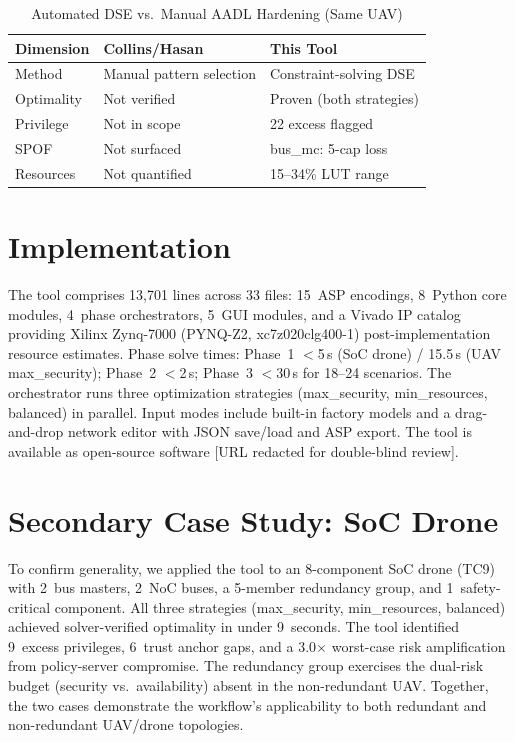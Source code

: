\documentclass[conference]{IEEEtran}
\begin{document}
\begin{table}[t]
\caption{Automated DSE vs.\ Manual AADL Hardening (Same UAV)}
\label{tab:comparison}
\centering
\scriptsize
\setlength{\tabcolsep}{3pt}
\begin{tabular}{lll}
\toprule
Dimension & Collins/Hasan~\cite{hasan_saecps} & This Tool \\
\midrule
Method    & Manual pattern selection & Constraint-solving DSE \\
Optimality& Not verified & Proven (both strategies) \\
Privilege & Not in scope & 22 excess flagged \\
SPOF      & Not surfaced & bus\_mc: 5-cap loss \\
Resources & Not quantified & 15--34\% LUT range \\
\bottomrule
\end{tabular}
\end{table}

\section{Implementation}

The tool comprises 13,701 lines across 33 files: 15~ASP encodings,
8~Python core modules, 4~phase orchestrators, 5~GUI modules, and a
Vivado IP catalog providing Xilinx Zynq-7000 (PYNQ-Z2, xc7z020clg400-1)
post-implementation resource estimates. Phase solve times: Phase~1
$<$5\,s (SoC drone) / 15.5\,s (UAV max\_security); Phase~2 $<$2\,s;
Phase~3 $<$30\,s for 18--24 scenarios. The orchestrator runs three
optimization strategies (max\_security, min\_resources, balanced) in
parallel. Input modes include built-in factory models and a
drag-and-drop network editor with JSON save/load and ASP export. The
tool is available as open-source software [URL redacted for
double-blind review].

\section{Secondary Case Study: SoC Drone}

To confirm generality, we applied the tool to an 8-component SoC drone
(TC9) with 2~bus masters, 2~NoC buses, a 5-member redundancy group,
and 1~safety-critical component. All three strategies (max\_security,
min\_resources, balanced) achieved solver-verified optimality in under
9~seconds. The tool identified 9~excess privileges, 6~trust anchor
gaps, and a 3.0$\times$ worst-case risk amplification from policy-server
compromise. The redundancy group exercises the dual-risk budget
(security vs.\ availability) absent in the non-redundant UAV. Together,
the two cases demonstrate the workflow's applicability to both redundant
and non-redundant UAV/drone topologies.
\end{document}
